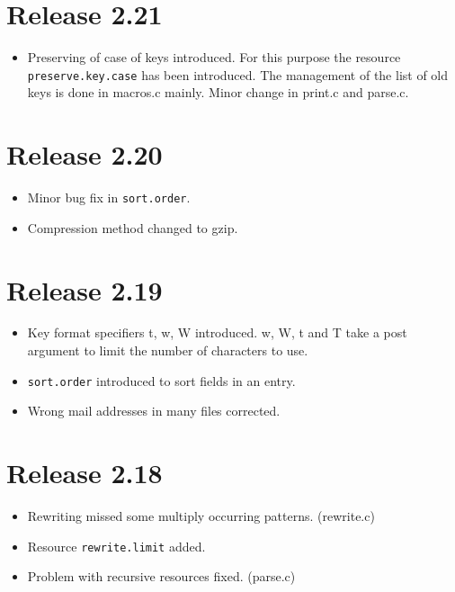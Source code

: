 \documentclass[11pt,a4paper]{scrartcl}
\newcommand\rsc[1]{\texttt{#1}}
\newcommand\File[1]{\textsf{#1}}
\newenvironment{Release}[2]{\section*{Release #1}\begin{itemize}}{\end{itemize}}
\newenvironment{Fix}[1]{\item }{}
\newenvironment{New}[1]{\item }{}
\newenvironment{Update}[1]{\item }{}
\begin{document}
 \begin{Release}{2.21}{}
  \begin{New}{gene}
    Preserving of case of keys introduced. For this purpose the
    resource \rsc{preserve.key.case} has been introduced. The
    management of the list of old keys is done in \File{macros.c}
    mainly. Minor change in \File{print.c} and \File{parse.c}.
  \end{New}
 \end{Release}

 \begin{Release}{2.20}{}
  \begin{Fix}{gene}
    Minor bug fix in \rsc{sort.order}.
  \end{Fix}
  \begin{Update}{gene}
    Compression method changed to gzip.
  \end{Update}
 \end{Release}

 \begin{Release}{2.19}{}
  \begin{New}{gene}
    Key format specifiers t, w, W introduced. w, W, t and T take a
    post argument to limit the number of characters to use.
  \end{New}
  \begin{New}{gene}
    \rsc{sort.order} introduced to sort fields in an entry.
  \end{New}
  \begin{Update}{gene}
    Wrong mail addresses in many files corrected.
  \end{Update}
 \end{Release}

 \begin{Release}{2.18}{}
  \begin{Fix}{gene}
    Rewriting missed some multiply occurring patterns.
    (\File{rewrite.c})
  \end{Fix}
  \begin{New}{gene}
    Resource \rsc{rewrite.limit} added.
  \end{New}
  \begin{Fix}{gene}
    Problem with recursive resources fixed. (\File{parse.c})
  \end{Fix}
 \end{Release}
\end{document}
